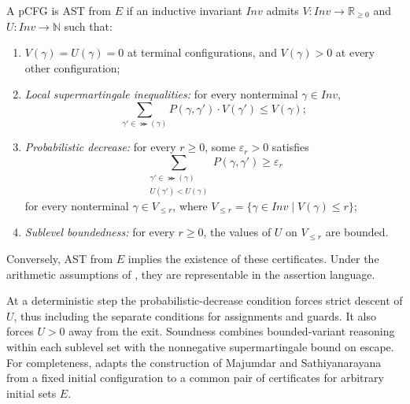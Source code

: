 \begin{theorem}
\label{thm:pcfg-rule}
A pCFG is AST from $E$ if an inductive invariant $\mathit{Inv}$ admits
$V:\mathit{Inv}\to\mathbb R_{\geq0}$ and
$U:\mathit{Inv}\to\mathbb N$ such that:
\begin{enumerate}
 \item $V(\gamma)=U(\gamma)=0$ at terminal configurations, and
       $V(\gamma)>0$ at every other configuration;
 \item \emph{Local supermartingale inequalities:} for every nonterminal
 $\gamma\in\mathit{Inv}$,
 \[
   \sum_{\gamma'\in\Succ(\gamma)}P(\gamma,\gamma') \cdot V(\gamma')
   \leq V(\gamma);
 \]
 \item \emph{Probabilistic decrease:} for every $r\geq0$, some
 $\varepsilon_r>0$ satisfies
 \[
   \sum_{\substack{\gamma'\in\Succ(\gamma)\\U(\gamma')<U(\gamma)}}
      P(\gamma,\gamma')\geq\varepsilon_r
 \]
 for every nonterminal $\gamma\in V_{\leq r}$, where
 $V_{\leq r}=\{\gamma\in\mathit{Inv}\mid V(\gamma)\leq r\}$;
 \item \emph{Sublevel boundedness:} for every $r\geq0$, the values of
 $U$ on $V_{\leq r}$ are bounded.
\end{enumerate}
Conversely, AST from $E$ implies the existence of these certificates.
Under the arithmetic assumptions of ,
they are representable in the assertion language.
\end{theorem}
At a deterministic step the probabilistic-decrease condition forces
strict descent of $U$, thus including the separate conditions for
assignments and guards. It also forces $U>0$ away from the exit.
Soundness combines bounded-variant reasoning within each sublevel set
with the nonnegative supermartingale bound on escape. For completeness,  adapts the construction
of Majumdar and
Sathiyanarayana~\cite{DBLP:journals/pacmpl/MajumdarS25}
from a fixed initial configuration to a common pair of certificates
for arbitrary initial sets $E$.

